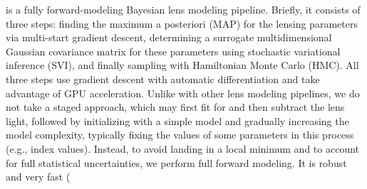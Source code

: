 \gigal is a fully forward-modeling Bayesian lens modeling pipeline.
Briefly, it consists of three steps: finding the maximum a posteriori (MAP) for the lensing parameters via multi-start gradient descent, determining a surrogate multidimensional Gaussian covariance matrix for these parameters using stochastic variational inference (SVI), and finally sampling with Hamiltonian Monte Carlo (HMC).
All three steps use gradient descent with automatic differentiation and take advantage of GPU acceleration.  
Unlike with other lens modeling pipelines, 
we do not take a staged approach, 
which may first fit for and then subtract the lens light, 
followed by initializing with a simple model and gradually increasing the model complexity, typically fixing the values of some parameters in this process (e.g., \ser index values).
Instead, to avoid landing in a local minimum and to account for full statistical uncertainties, we perform full forward modeling.
It is robust and very fast (


 

